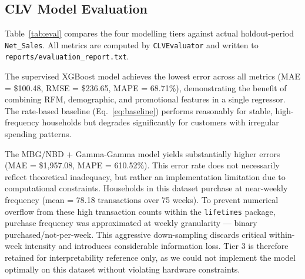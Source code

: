 \documentclass[conference]{IEEEtran}
\begin{document}
\subsection{CLV Model Evaluation}

Table~\ref{tab:eval} compares the four modelling tiers against
actual holdout-period \texttt{Net\_Sales}. All metrics are
computed by \texttt{CLVEvaluator} and written to
\texttt{reports/evaluation\_report.txt}.

\begin{table}[H]
\centering
\caption{Model evaluation on holdout period (Weeks 76--102).}
\label{tab:eval}
\end{table}

The supervised XGBoost model achieves the lowest error across all metrics (MAE = \$100.48, RMSE = \$236.65, MAPE = 68.71\%), demonstrating the benefit of combining RFM, demographic, and promotional features in a single regressor. The rate-based baseline (Eq.~\ref{eq:baseline}) performs reasonably for stable, high-frequency households but degrades significantly for customers with irregular spending patterns.

The MBG/NBD + Gamma-Gamma model yields substantially higher errors (MAE = \$1,957.08, MAPE = 610.52\%). This error rate does not necessarily reflect theoretical inadequacy, but rather an implementation limitation due to computational constraints. Households in this dataset purchase at near-weekly frequency (mean = 78.18 transactions over 75 weeks). To prevent numerical overflow from these high transaction counts within the \texttt{lifetimes} package, purchase frequency was approximated at weekly granularity --- binary purchased/not-per-week. This aggressive down-sampling discards critical within-week intensity and introduces considerable information loss. Tier 3 is therefore retained for interpretability reference only, as we could not implement the model optimally on this dataset without violating hardware constraints.
\end{document}
